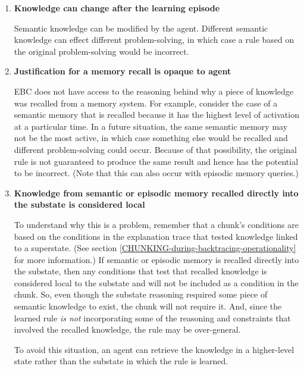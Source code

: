 \begin{enumerate}
	\item \textbf{Knowledge can change after the learning episode} \hfill

	Semantic knowledge can be modified by the agent.  Different semantic knowledge can effect different problem-solving, in which case a rule based on the original problem-solving would be incorrect.

	\item \textbf{Justification for a memory recall is opaque to agent} \hfill

	EBC does not have access to the reasoning behind why a piece of knowledge was recalled from a memory system.  For example, consider the case of a semantic memory that is recalled because it has the highest level of activation at a particular time.  In a future situation, the same semantic memory may not be the most active, in which case something else would be recalled and different problem-solving could occur.  Because of that possibility, the original rule is not guaranteed to produce the same result and hence has the potential to be incorrect.  (Note that this can also occur with episodic memory queries.)

	\item \textbf{Knowledge from semantic or episodic memory recalled directly into the substate is considered local} \hfill

	To understand why this is a problem, remember that a chunk's conditions are based on the conditions in the explanation trace that tested knowledge linked to a superstate.  (See section \ref{CHUNKING-during-backtracing-operationality} for more information.) If semantic or episodic memory is recalled directly into the substate, then any conditions that test that recalled knowledge is considered local to the substate and will not be included as a condition in the chunk.  So, even though the substate reasoning required some piece of semantic knowledge to exist, the chunk will not require it.  And, since the learned rule \textit{is not} incorporating some of the reasoning and constraints that involved the recalled knowledge, the rule may be over-general.

	To avoid this situation, an agent can retrieve the knowledge in a higher-level state rather than the substate in which the rule is learned.
\end{enumerate}

